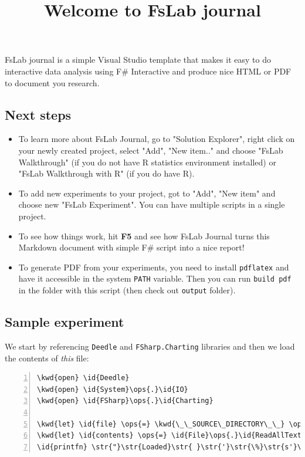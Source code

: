 \documentclass{article}
\title{Welcome to FsLab journal}
\date{}
\newcommand{\id}[1]{\textcolor{black}{#1}}
\newcommand{\kwd}[1]{\textcolor{navy}{#1}}
\newcommand{\ops}[1]{\textcolor{purple}{#1}}
\newcommand{\str}[1]{\textcolor{olive}{#1}}
\begin{document}
\maketitle



FsLab journal is a simple Visual Studio template that makes it easy to do 
interactive data analysis using F\# Interactive and produce nice HTML or PDF 
to document you research.
\subsection*{Next steps}

\begin{itemize}
\item 

To learn more about FsLab Journal, go to "Solution Explorer", right click
on your newly created project, select "Add", "New item.." and choose
"FsLab Walkthrough" (if you do not have R statistics environment installed)
or "FsLab Walkthrough with R" (if you do have R).

\item 

To add new experiments to your project, got to "Add", "New item" and choose
new "FsLab Experiment". You can have multiple scripts in a single project.

\item 

To see how things work, hit \textbf{F5} and see how FsLab Journal turns this
Markdown document with simple F\# script into a nice report!

\item 

To generate PDF from your experiments, you need to install \texttt{pdflatex} and 
have it accessible in the system \texttt{PATH} variable. Then you can run
\texttt{build pdf} in the folder with this script (then check out \texttt{output} folder).

\end{itemize}

\subsection*{Sample experiment}



We start by referencing \texttt{Deedle} and \texttt{FSharp.Charting} libraries and then we
load the contents of \emph{this} file:
\begin{Verbatim}[commandchars=\\\{\}, numbers=left]
\kwd{open} \id{Deedle}
\kwd{open} \id{System}\ops{.}\id{IO}
\kwd{open} \id{FSharp}\ops{.}\id{Charting}

\kwd{let} \id{file} \ops{=} \kwd{\_\_SOURCE\_DIRECTORY\_\_} \ops{+} \str{"}\str{{\textbackslash}{\textbackslash}}\str{Tutorial}\str{.}\str{fsx}\str{"}
\kwd{let} \id{contents} \ops{=} \id{File}\ops{.}\id{ReadAllText}(\id{file})
\id{printfn} \str{"}\str{Loaded}\str{ }\str{'}\str{\%}\str{s'}\str{ }\str{of}\str{ }\str{length}\str{ }\str{\%}\str{d}\str{"} \id{file} \id{contents}\ops{.}\id{Length}
\end{Verbatim}
\end{document}
